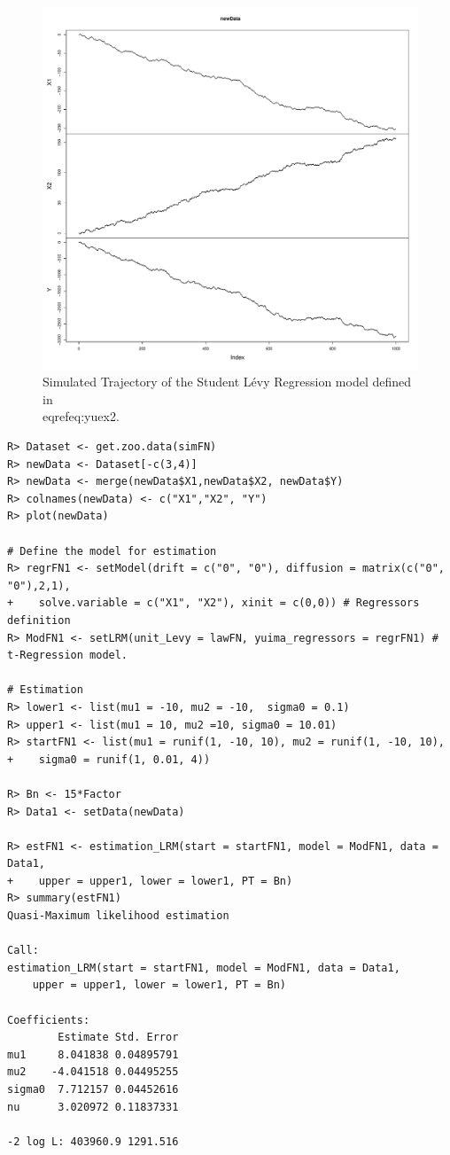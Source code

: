 \begin{figure}

{\centering \includegraphics[width=1\linewidth]{figures/Simulation_Mod3} 

}

\caption{Simulated Trajectory of the Student Lévy Regression model defined in \\eqref{eq:yuex2}.}\label{fig:SimulationMod3}
\end{figure}

\begin{verbatim}
R> Dataset <- get.zoo.data(simFN)
R> newData <- Dataset[-c(3,4)]
R> newData <- merge(newData$X1,newData$X2, newData$Y)
R> colnames(newData) <- c("X1","X2", "Y")
R> plot(newData)

# Define the model for estimation
R> regrFN1 <- setModel(drift = c("0", "0"), diffusion = matrix(c("0", "0"),2,1),
+    solve.variable = c("X1", "X2"), xinit = c(0,0)) # Regressors definition
R> ModFN1 <- setLRM(unit_Levy = lawFN, yuima_regressors = regrFN1) # t-Regression model.

# Estimation
R> lower1 <- list(mu1 = -10, mu2 = -10,  sigma0 = 0.1)
R> upper1 <- list(mu1 = 10, mu2 =10, sigma0 = 10.01)
R> startFN1 <- list(mu1 = runif(1, -10, 10), mu2 = runif(1, -10, 10),
+    sigma0 = runif(1, 0.01, 4))

R> Bn <- 15*Factor
R> Data1 <- setData(newData)

R> estFN1 <- estimation_LRM(start = startFN1, model = ModFN1, data = Data1,
+    upper = upper1, lower = lower1, PT = Bn)
R> summary(estFN1)
Quasi-Maximum likelihood estimation

Call:
estimation_LRM(start = startFN1, model = ModFN1, data = Data1,
    upper = upper1, lower = lower1, PT = Bn)

Coefficients:
        Estimate Std. Error
mu1     8.041838 0.04895791
mu2    -4.041518 0.04495255
sigma0  7.712157 0.04452616
nu      3.020972 0.11837331

-2 log L: 403960.9 1291.516
\end{verbatim}

